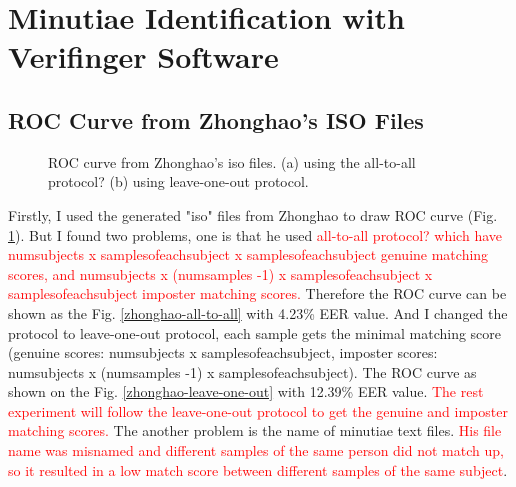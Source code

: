 \section{Minutiae Identification with Verifinger Software}

\subsection{ROC Curve from Zhonghao's ISO Files}

\begin{figure}[h]
    \centering
    \caption{ROC curve from Zhonghao's iso files. (a) using the all-to-all protocol? (b) using leave-one-out protocol.}
    \label{zhonghao}
\end{figure}

Firstly, I used the generated "iso" files from Zhonghao to draw ROC curve (Fig. \ref{zhonghao}). But I found two problems, one is that he used \textcolor{red}{all-to-all protocol? which have numsubjects x samplesofeachsubject x samplesofeachsubject genuine matching scores, and numsubjects x (numsamples -1) x samplesofeachsubject x samplesofeachsubject imposter matching scores.} Therefore the ROC curve can be shown as the Fig. \ref{zhonghao-all-to-all} with 4.23\% EER value. And I changed the protocol to leave-one-out protocol, each sample gets the minimal matching score (genuine scores: numsubjects x samplesofeachsubject, imposter scores: numsubjects x (numsamples -1) x samplesofeachsubject). The ROC curve as shown on the Fig. \ref{zhonghao-leave-one-out} with 12.39\% EER value. \textcolor{red}{The rest experiment will follow the leave-one-out protocol to get the genuine and imposter matching scores.} The another problem is the name of minutiae text files. \textcolor{red}{His file name was misnamed and different samples of the same person did not match up, so it resulted in a low match score between different samples of the same subject}.

